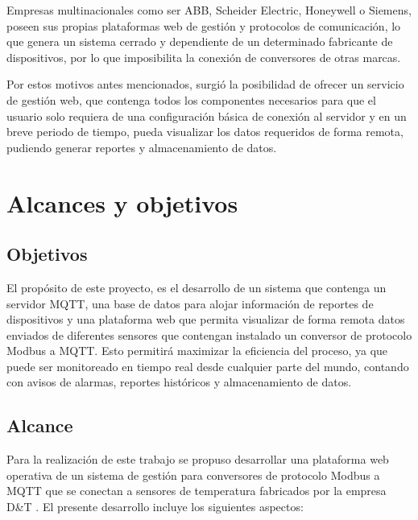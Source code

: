 Empresas multinacionales como ser ABB, Scheider Electric, Honeywell o Siemens,  poseen sus propias plataformas web de gestión y protocolos de comunicación, lo que genera un sistema cerrado y dependiente de un determinado fabricante de dispositivos, por lo que imposibilita la conexión de conversores de otras marcas. 

Por estos motivos antes mencionados, surgió la posibilidad de ofrecer un servicio de gestión web, que contenga todos los componentes necesarios para que el usuario solo requiera de una configuración básica de conexión al servidor y en un breve periodo de tiempo, pueda visualizar los datos requeridos de forma remota, pudiendo generar reportes y almacenamiento de datos. 



\section{Alcances y objetivos}

\subsection{Objetivos}

El propósito de este proyecto,  es el desarrollo de un sistema que contenga un servidor MQTT, una base de datos para alojar información de reportes de dispositivos y una plataforma web que permita visualizar de forma remota datos enviados de diferentes sensores que contengan instalado un conversor de protocolo Modbus a MQTT.  Esto permitirá maximizar la eficiencia del proceso, ya que puede ser monitoreado en tiempo real desde cualquier parte del mundo, contando con avisos de alarmas, reportes históricos y almacenamiento de datos. 

\subsection{Alcance}

Para la realización de este trabajo se propuso desarrollar una plataforma web operativa de un sistema de gestión para conversores de protocolo Modbus a MQTT que se conectan a sensores de temperatura fabricados por la empresa D\&T \citep{WEBSITE:8}.  El presente desarrollo incluye los siguientes aspectos:

